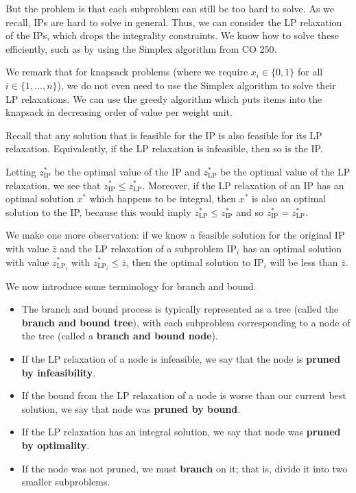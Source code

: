 But the problem is that each subproblem can still be too hard to solve. As 
we recall, IPs are hard to solve in general. 
Thus, we can consider the LP relaxation of the IPs, which drops the integrality 
constraints. We know how to solve these efficiently, such as by using the 
Simplex algorithm from CO 250. 

We remark that for knapsack problems (where we require $x_i \in \{0, 1\}$ for all 
$i \in \{1, \dots, n\}$), we do not even need to use the Simplex 
algorithm to solve their LP relaxations. We can use the greedy algorithm 
which puts items into the knapsack in decreasing order of value per 
weight unit. 

Recall that any solution that is feasible for the IP is also feasible 
for its LP relaxation. Equivalently, if the LP relaxation is infeasible, 
then so is the IP. 

Letting $z_{\text{IP}}^*$ be the optimal value of the 
IP and $z_{\text{LP}}^*$ be the optimal value of the LP relaxation, 
we see that $z_{\text{IP}}^* \leq z_{\text{LP}}^*$. Moreover, if the LP 
relaxation of an IP has an optimal solution $x^*$ which happens 
to be integral, then $x^*$ is also an optimal solution to the IP, because 
this would imply $z_{\text{LP}}^* \leq z_{\text{IP}}^*$ and so 
$z_{\text{IP}}^* = z_{\text{LP}}^*$. 

We make one more observation: if we know a feasible solution for the original 
IP with value $\bar{z}$ and the LP relaxation of a subproblem $\text{IP}_i$ 
has an optimal solution with value $z_{\text{LP}_i}^*$ with 
$z_{\text{LP}_i}^* \leq \bar{z}$, then the optimal solution to $\text{IP}_i$ 
will be less than $\bar{z}$. 

We now introduce some terminology for branch and bound. 
\begin{itemize}
    \item The branch and bound process is typically represented as a tree 
    (called the {\bf branch and bound tree}), with each subproblem corresponding 
    to a node of the tree (called a {\bf branch and bound node}). 
    \item If the LP relaxation of a node is infeasible, we say that the 
    node is {\bf pruned by infeasibility}. 
    \item If the bound from the LP relaxation of a node is worse than 
    our current best solution, we say that node was {\bf pruned by bound}. 
    \item If the LP relaxation has an integral solution, we say that node was 
    {\bf pruned by optimality}. 
    \item If the node was not pruned, we must {\bf branch} on it; that is, 
    divide it into two smaller subproblems.
\end{itemize}

